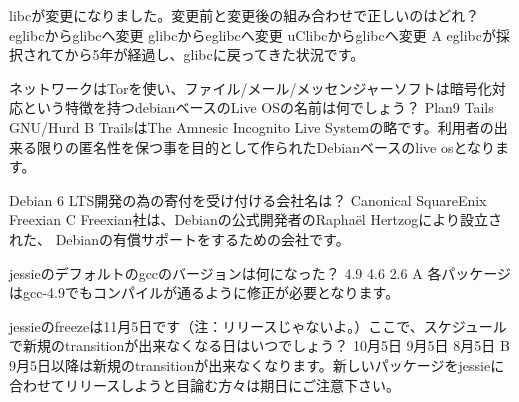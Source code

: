 %

\santaku
{libcが変更になりました。変更前と変更後の組み合わせで正しいのはどれ？}
{eglibcからglibcへ変更}
{glibcからeglibcへ変更}
{uClibcからglibcへ変更}
{A}
{eglibcが採択されてから5年が経過し、glibcに戻ってきた状況です。}

\santaku
{ネットワークはTorを使い、ファイル/メール/メッセンジャーソフトは暗号化対応という特徴を持つdebianベースのLive OSの名前は何でしょう？}
{Plan9}
{Tails}
{GNU/Hurd}
{B}
{TrailsはThe Amnesic Incognito Live Systemの略です。利用者の出来る限りの匿名性を保つ事を目的として作られたDebianベースのlive osとなります。}

\santaku
{Debian 6 LTS開発の為の寄付を受け付ける会社名は？}
{Canonical}
{SquareEnix}
{Freexian}
{C}
{Freexian社は、Debianの公式開発者のRapha\"el Hertzogにより設立された、
Debianの有償サポートをするための会社です。}

\santaku
{jessieのデフォルトのgccのバージョンは何になった？}
{4.9}
{4.6}
{2.6}
{A}
{各パッケージはgcc-4.9でもコンパイルが通るように修正が必要となります。}

\santaku
{jessieのfreezeは11月5日です（注：リリースじゃないよ。）ここで、スケジュールで新規のtransitionが出来なくなる日はいつでしょう？}
{10月5日}
{9月5日}
{8月5日}
{B}
{9月5日以降は新規のtransitionが出来なくなります。新しいパッケージをjessieに合わせてリリースしようと目論む方々は期日にご注意下さい。}




